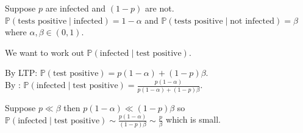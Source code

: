 \begin{example}
    Suppose $p$ are infected and $(1 - p)$ are not.
    $\mathbb{P}(\text{tests positive} \mid \text{infected}) = 1 - \alpha$ and $\mathbb{P}(\text{tests positive} \mid \text{not infected}) = \beta$ where $\alpha, \beta \in (0, 1)$.

    We want to work out $\mathbb{P}(\text{infected} \mid \text{test positive})$.

    By LTP: $\mathbb{P}(\text{test positive}) = p (1 - \alpha) + (1 - p) \beta$. \\
    By : $\mathbb{P}(\text{infected} \mid \text{test positive}) = \frac{p (1 - \alpha)}{p (1 - \alpha) + (1 - p) \beta}$.

    Suppose $p \ll \beta$ then $p(1 - \alpha) \ll (1 - p) \beta$ so $\mathbb{P}(\text{infected} \mid \text{test positive}) \sim \frac{p(1 - \alpha)}{(1 - p) \beta} \sim \frac{p}{\beta}$ which is small.
\end{example} 

